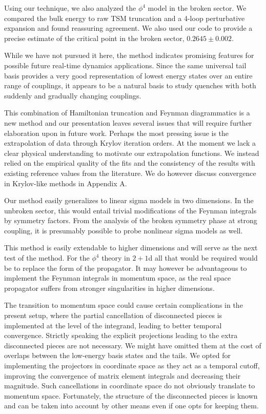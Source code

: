 \documentclass[twocolumn,secnumarabic,amssymb, nobibnotes, aps, prd]{revtex4-2}
\begin{document}
Using our technique, we also analyzed the $\phi^4$ model in the broken sector.  We compared the bulk energy to raw TSM truncation and a 4-loop perturbative expansion and found reassuring agreement. We also used our code to provide a precise estimate of the critical point in the broken sector, $0.2645\pm0.002$.

While we have not pursued it here, the method indicates promising features for possible future real-time dynamics applications. Since the same universal tail basis provides a very good representation of lowest energy states over an entire range of couplings, it appears to be a natural basis to study quenches with both suddenly and gradually changing couplings.

This combination of Hamiltonian truncation and Feynman diagrammatics is a new method and our presentation leaves several issues that will require further elaboration upon in future work.  Perhaps the most pressing issue is the extrapolation of data through Krylov iteration orders. At the moment we lack a clear physical understanding to motivate our extrapolation functions.  We instead relied on the empirical quality of the fits and the consistency of the results with existing reference values from the literature.  We do however discuss convergence in Krylov-like methods in Appendix A.

Our method easily generalizes to linear sigma models in two dimensions. In the unbroken sector, this would entail trivial modifications of the Feynman integrals by symmetry factors. From the analysis of the broken symmetry phase at strong coupling, it is presumably possible to probe nonlinear sigma models as well.

This method is easily extendable to higher dimensions and will serve as the next test of the method.  For the $\phi^4$ theory in $2+1$d all that would be required would be to replace the form of the propagator.   It may however be advantageous to implement the Feynman integrals in momentum space, as the real space propagator suffers from stronger singularities in higher dimensions.

The transition to momentum space could cause certain complications in the present setup, where the partial cancellation of disconnected pieces is implemented at the level of the integrand, leading to better temporal convergence. 
Strictly speaking the explicit projections leading to the extra disconnected pieces are not necessary. We might have omitted them at the cost of overlaps between the low-energy basis states and the tails.  We opted for implementing the projectors in coordinate space as they act as a temporal cutoff, improving the convergence of matrix element integrals and decreasing their magnitude. Such cancellations in coordinate space do not obviously translate to momentum space.  Fortunately, the structure of the disconnected pieces is known and can be taken into account by other means even if one opts for keeping them.  
\end{document}
